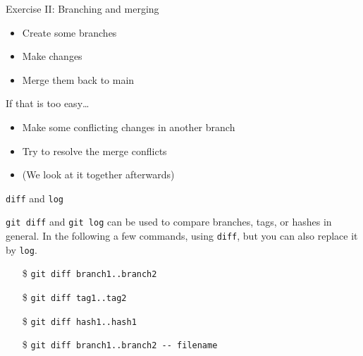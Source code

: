 \documentclass[aspectratio=169]{beamer}
\newcommand{\code}[1]{\texttt{\color{mygreen}#1}}
\begin{document}
\begin{frame}
  {Exercise II: Branching and merging}

  \begin{itemize}
    \item Create some branches
    \item Make changes
    \item Merge them back to main
  \end{itemize}

  \vspace{1cm}
  If that is too easy\ldots

  \begin{itemize}
    \item Make some conflicting changes in another branch
    \item Try to resolve the merge conflicts
    \item (We look at it together afterwards)
  \end{itemize}

\end{frame}

\begin{frame}
  {\code{diff} and \code{log}}

  \code{git diff} and \code{git log} can be used to compare branches,
  tags, or hashes in general. In the following a few commands, using
  \code{diff}, but you can also replace it by \code{log}.

  \begin{itemize}
    \item[\$] \code{git diff branch1..branch2}
    \item[\$] \code{git diff tag1..tag2}
    \item[\$] \code{git diff hash1..hash1}
    \item[\$] \code{git diff branch1..branch2 -{}- filename}
  \end{itemize}

\end{frame}
\end{document}
